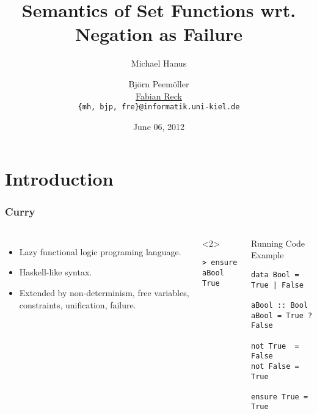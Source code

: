 \documentclass[utf8]{beamer}
\begin{document}
\title[Set Functions and Negation as Failure]{Semantics of Set Functions wrt. Negation as Failure}

\date{June 06, 2012}

\author[M. Hanus, B. Peemöller, \underline{F. Reck}]
 { Michael Hanus \and Björn Peemöller\\
            \underline{Fabian Reck} \\
  \texttt{\{mh, bjp, fre\}@informatik.uni-kiel.de}}


\begin{frame}
\titlepage
\end{frame}

\section{Introduction}

\begin{frame}[fragile]
\frametitle{Curry}
\begin{columns}[t]
\begin{itemize}
\item Lazy functional logic programing language.
\item Haskell-like syntax.
\item Extended by non-determinism, free variables, constraints, unification,
      failure.
\end{itemize}
\begin{example}<2>
\begin{lstlisting}
> ensure aBool
True
\end{lstlisting}
\end{example}
\begin{block}{Running Code Example}
\begin{lstlisting}
data Bool = True | False

aBool :: Bool
aBool = True ? False

not True  = False
not False = True

ensure True = True
\end{lstlisting}
\end{block}
\end{columns}
\end{frame}
\end{document}
